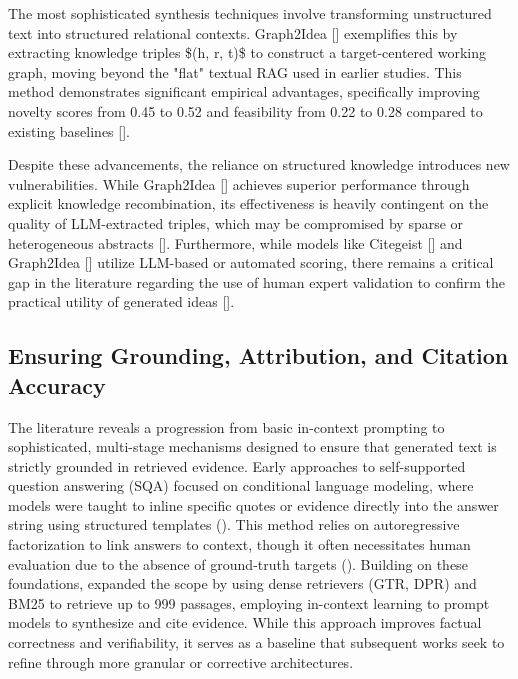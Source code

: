 \documentclass[11pt]{article}
\begin{document}
The most sophisticated synthesis techniques involve transforming unstructured text into structured relational contexts. Graph2Idea [\citep{2606.09105}] exemplifies this by extracting knowledge triples \$(h, r, t)\$ to construct a target-centered working graph, moving beyond the "flat" textual RAG used in earlier studies. This method demonstrates significant empirical advantages, specifically improving novelty scores from 0.45 to 0.52 and feasibility from 0.22 to 0.28 compared to existing baselines [\citep{2606.09105}].

Despite these advancements, the reliance on structured knowledge introduces new vulnerabilities. While Graph2Idea [\citep{2606.09105}] achieves superior performance through explicit knowledge recombination, its effectiveness is heavily contingent on the quality of LLM-extracted triples, which may be compromised by sparse or heterogeneous abstracts [\citep{2606.09105}]. Furthermore, while models like Citegeist [\citep{2503.23229}] and Graph2Idea [\citep{2606.09105}] utilize LLM-based or automated scoring, there remains a critical gap in the literature regarding the use of human expert validation to confirm the practical utility of generated ideas [\citep{2606.09105}].

\subsection{Ensuring Grounding, Attribution, and Citation Accuracy}

The literature reveals a progression from basic in-context prompting to sophisticated, multi-stage mechanisms designed to ensure that generated text is strictly grounded in retrieved evidence. Early approaches to self-supported question answering (SQA) focused on conditional language modeling, where models were taught to inline specific quotes or evidence directly into the answer string using structured templates (\citep{2203.11147}). This method relies on autoregressive factorization to link answers to context, though it often necessitates human evaluation due to the absence of ground-truth targets (\citep{2203.11147}). Building on these foundations, \citep{2305.14627} expanded the scope by using dense retrievers (GTR, DPR) and BM25 to retrieve up to 999 passages, employing in-context learning to prompt models to synthesize and cite evidence. While this approach improves factual correctness and verifiability, it serves as a baseline that subsequent works seek to refine through more granular or corrective architectures.
\end{document}

